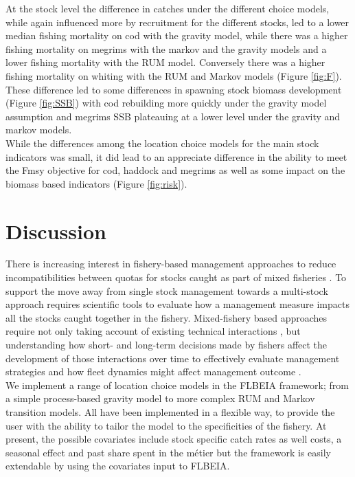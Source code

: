\documentclass[12pt, halfline, a4paper]{ouparticle}
\begin{document}
At the stock level the difference in catches under the different choice models,
while again influenced more by recruitment for the different stocks, led to a
lower median fishing mortality on cod with the gravity model, while there was a
higher fishing mortality on megrims with the markov and the gravity models and
a lower fishing mortality with the RUM model. Conversely there was a higher
fishing mortality on whiting with the RUM and Markov models (Figure
\ref{fig:F}). These difference led to some differences in spawning stock
biomass development (Figure \ref{fig:SSB}) with cod rebuilding more quickly
under the gravity model assumption and megrims SSB plateauing at a lower level
under the gravity and markov models. \\

While the differences among the location choice models for the main stock
indicators was small, it did lead to an appreciate difference in the ability to
meet the Fmsy objective for cod, haddock and megrims as well as some impact on
the biomass based indicators (Figure \ref{fig:risk}). 

\section{Discussion}
\label{dis}

There is increasing interest in fishery-based management approaches to reduce
incompatibilities between quotas for stocks caught as part of mixed fisheries
\citep{Ulrich2016, Garcia2020}. To support the move away from single stock
management towards a multi-stock approach requires scientific tools to evaluate
how a management measure impacts all the stocks caught together in the fishery.
Mixed-fishery based approaches require not only taking account of existing
technical interactions \citep{Ulrich2011, Garcia2017}, but understanding how
short- and long-term decisions made by fishers affect the development of those
interactions over time to effectively evaluate management strategies and how
fleet dynamics might affect management outcome \citep{Marchal2013}. \\

We implement a range of location choice models in the FLBEIA framework; from a
simple process-based gravity model to more complex RUM and Markov transition
models. All have been implemented in a flexible way, to provide the user with
the ability to tailor the model to the specificities of the fishery. At
present, the possible covariates include stock specific catch rates as well
costs, a seasonal effect and past share spent in the métier but the framework
is easily extendable by using the covariates input to FLBEIA. \\
\end{document}
